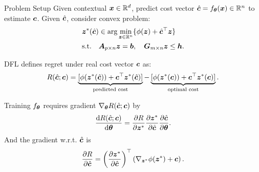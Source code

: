 \documentclass[10pt,aspectratio=169,xcolor=dvipsnames]{beamer}
\begin{document}
\begin{frame}{Problem Setup}
    Given contextual ${\bm{x}} \in \mathbb{R}^d$, predict cost vector $\hat{{\bm{c}}} = f_{\bm{\theta}}({\bm{x}}) \in \mathbb{R}^n$ to estimate ${\bm{c}}$. Given $\hat{{\bm{c}}}$, consider convex problem:
    \begin{equation}
        \begin{aligned}
            & {\bm{z}}^*(\hat{{\bm{c}}})  \in \arg\min_{{\bm{z}} \in \mathbb{R}^n} \{ \phi({\bm{z}}) + \hat{{\bm{c}}}^\top {\bm{z}} \}\\
            & \text{s.t.}\quad {\bm{A}}_{p \times n} {\bm{z}} = {\bm{b}} ,\quad
             {\bm{G}}_{m \times n} {\bm{z}} \leq {\bm{h}}.
        \end{aligned}
    \end{equation}

    DFL defines regret under real cost vector ${\bm{c}}$ as:
    \begin{equation}
        R(\hat{{\bm{c}}}; {\bm{c}}) = \underbrace{[\phi({\bm{z}}^*(\hat{{\bm{c}}})) + {\bm{c}}^\top {\bm{z}}^*(\hat{{\bm{c}}})]}_{\text{predicted cost}} - \underbrace{[\phi({\bm{z}}^*({\bm{c}})) + {\bm{c}}^\top {\bm{z}}^*({\bm{c}})]}_{\text{optimal cost}}.
    \end{equation}

    Training $f_{\bm{\theta}}$ requires gradient $\nabla_{\bm{\theta}} R(\hat{{\bm{c}}}; {\bm{c}})$ by
    \begin{equation}
        \frac{\mathrm{d} R(\hat{{\bm{c}}}; {\bm{c}})}{\mathrm{d} {\bm{\theta}}} = \frac{\partial R}{\partial {\bm{z}}^*} \frac{\partial {\bm{z}}^*}{\partial \hat{{\bm{c}}}} \frac{\partial \hat{{\bm{c}}}}{\partial {\bm{\theta}}}.
    \end{equation}
    And the gradient w.r.t. $\hat{{\bm{c}}}$ is
    \begin{equation}
        \frac{\partial R}{\partial \hat{{\bm{c}}}} = \left( \frac{\partial {\bm{z}}^*}{\partial \hat{{\bm{c}}}} \right)^\top \left( \nabla_{{\bm{z}}^*} \phi({\bm{z}}^*) + {\bm{c}} \right).
    \end{equation}


\end{frame}
\end{document}
